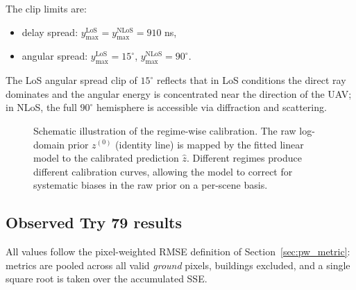 \documentclass[11pt,a4paper]{article}
\begin{document}
The clip limits are:
\begin{itemize}
\item delay spread: $y_{\max}^{\mathrm{LoS}} = y_{\max}^{\mathrm{NLoS}} = 910$ ns,
\item angular spread: $y_{\max}^{\mathrm{LoS}} = 15^\circ$,
      $y_{\max}^{\mathrm{NLoS}} = 90^\circ$.
\end{itemize}

The LoS angular spread clip of $15^\circ$ reflects that in LoS conditions the
direct ray dominates and the angular energy is concentrated near the direction
of the UAV; in NLoS, the full $90^\circ$ hemisphere is accessible via
diffraction and scattering.

\begin{figure}[H]
\centering
{}
\caption{Schematic illustration of the regime-wise calibration. The raw
log-domain prior $z^{(0)}$ (identity line) is mapped by the fitted linear
model to the calibrated prediction $\hat{z}$. Different regimes produce
different calibration curves, allowing the model to correct for systematic
biases in the raw prior on a per-scene basis.}
\label{fig:spread_cal}
\end{figure}

\subsection{Observed Try 79 results}

All values follow the pixel-weighted RMSE definition of
Section~\ref{sec:pw_metric}: metrics are pooled across all valid \emph{ground}
pixels, buildings excluded, and a single square root is taken over the
accumulated SSE.
\end{document}
